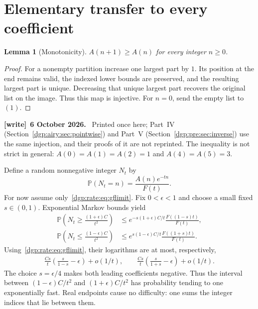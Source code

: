 \documentclass[11pt,letterpaper]{article}
\numberwithin{equation}{section}
\newtheorem{lemma}[theorem]{Lemma}
\theoremstyle{remark}\newtheorem{remark}[theorem]{Remark}
\newcommand{\PP}{\mathbb P}
\newenvironment{writenote}[1][]{\par\smallskip\begingroup\small
 \noindent\textbf{[write]}\if\relax\detokenize{#1}\relax\else~\textbf{#1.}\fi\ }%
 {\par\endgroup\smallskip}
\begin{document}
\section{Elementary transfer to every coefficient}\label{dgp:rate:sec:transfer}
\begin{lemma}[Monotonicity]\label{dgp:rate:lem:mono}
$A(n+1)\geq A(n)$ for every integer $n\geq0$.
\end{lemma}
\begin{proof}
For a nonempty partition increase one largest part by $1$. Its position
at the end remains valid, the indexed lower bounds are preserved, and
the resulting largest part is unique. Decreasing that unique largest
part recovers the original list on the image. Thus this map is injective.
For $n=0$, send the empty list to $(1)$.
\end{proof}
\begin{writenote}[6 October 2026]
Printed once here; Part~IV (Section~\ref{dgp:airy:sec:pointwise}) and Part~V (Section~\ref{dgp:pre:sec:inverse}) use the same injection, and their proofs of it are not reprinted. The inequality is not strict in general: $A(0)=A(1)=A(2)=1$ and $A(4)=A(5)=3$.
\end{writenote}

Define a random nonnegative integer $N_t$ by
\begin{equation}\label{dgp:rate:eq:Boltzmann}
 \PP(N_t=n)=\frac{A(n)e^{-tn}}{F(t)}.
\end{equation}
For now assume only~\eqref{dgp:rate:eq:gflimit}. Fix $0<\epsilon<1$ and choose
a small fixed $s\in(0,1)$. Exponential Markov bounds yield
\begin{align}
 \PP\left(N_t\geq\frac{(1+\epsilon)C}{t^2}\right)
 &\leq e^{-s(1+\epsilon)C/t}\frac{F((1-s)t)}{F(t)},\label{dgp:rate:eq:upperchernoff}\\
 \PP\left(N_t\leq\frac{(1-\epsilon)C}{t^2}\right)
 &\leq e^{s(1-\epsilon)C/t}\frac{F((1+s)t)}{F(t)}.\label{dgp:rate:eq:lowerchernoff}
\end{align}
Using~\eqref{dgp:rate:eq:gflimit}, their logarithms are at most, respectively,
\begin{align*}
 \frac{Cs}{t}\left(\frac{s}{1-s}-\epsilon\right)+o(1/t),\qquad
 \frac{Cs}{t}\left(\frac{s}{1+s}-\epsilon\right)+o(1/t).
\end{align*}
The choice $s=\epsilon/4$ makes both leading coefficients negative.
Thus the interval between $(1-\epsilon)C/t^2$ and
$(1+\epsilon)C/t^2$ has probability tending to one exponentially fast.
Real endpoints cause no difficulty: one sums the integer indices that
lie between them.
\end{document}
